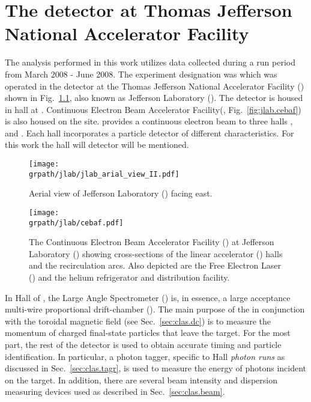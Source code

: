 \setcounter{chapter}{0}
\graphicspath{{/Users/Mike/phdthesis/MY_THESIS}}
\chapter{\label{sec:clas}The  detector at Thomas Jefferson National Accelerator Facility }

The analysis performed in this work utilizes data collected during a run period from March 2008 - June 2008. The experiment designation was   which was operated in the  detector\cite{clas} at the Thomas Jefferson National Accelerator Facility (\label{abbr:tjnaf}) shown in Fig.~\ref{fig:jlab.aerial}, also known as Jefferson Laboratory (\label{abbr:jlab}). The  detector is housed in hall  at . Continuous Electron Beam Accelerator Facility\cite{cebaf}(\label{abbr:cebaf}, Fig.~\ref{fig:jlab.cebaf}) is also housed on the  site.  provides a continuous electron beam to three halls ,  and . Each hall incorporates a particle detector of different characteristics. For this work the hall  will  detector will be mentioned.

\begin{figure}\begin{center}
\texttt{[image: \\grpath/jlab/jlab\_arial\_view\_II.pdf]}
\caption[ Aerial View (photograph)]{\label{fig:jlab.aerial}Aerial view of Jefferson Laboratory () facing east.}
\end{center}\end{figure}

\begin{figure}\begin{center}
\texttt{[image: \\grpath/jlab/cebaf.pdf]}
\caption[ Facility]{\label{fig:jlab.cebaf}The Continuous Electron Beam Accelerator Facility\cite{cebaf} () at Jefferson Laboratory () showing cross-sections of the linear accelerator () halls and the recirculation arcs. Also depicted are the Free Electron Laser (\label{abbr:fel}) and the helium refrigerator and distribution facility.}
\end{center}\end{figure}

In Hall  of , the  Large Angle Spectrometer (\label{abbr:clas}) is, in essence, a large acceptance multi-wire proportional drift-chamber (). The main purpose of the  in conjunction with the toroidal magnetic field (see Sec.~\ref{sec:clas.dc}) is to measure the momentum of charged final-state particles that leave the target. For the most part, the rest of the  detector is used to obtain accurate timing and particle identification. In particular, a photon tagger, specific to Hall  \emph{photon runs} as discussed in Sec.~\ref{sec:clas.tagr}, is used to measure the energy of photons incident on the target. In addition, there are several beam intensity and dispersion measuring devices used as described in Sec.~\ref{sec:clas.beam}.

